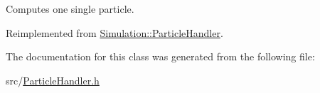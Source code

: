 Computes one single particle. 



Reimplemented from \hyperlink{classSimulation_1_1ParticleHandler_a6b1fc310603bc10093d50c674097fd25}{Simulation\-::\-Particle\-Handler}.



The documentation for this class was generated from the following file\-:\begin{DoxyCompactItemize}
\item 
src/\hyperlink{ParticleHandler_8h}{Particle\-Handler.\-h}\end{DoxyCompactItemize}
